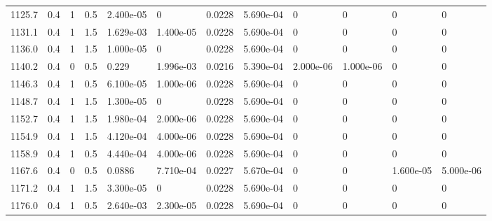 \documentclass[preview]{standalone}
\begin{document}
{{{{{{\begin{tabular}{L{1.2cm}C{1.2cm} C{0.3cm}C{0.5cm} C{1.4cm}C{1.4cm} C{1.4cm}C{1.4cm} C{1.6cm}C{1.6cm} C{1.6cm}C{1.6cm}}
  1125.7  &   0.4  & 1     & 0.5 &  2.400e-05  & 0  &  0.0228&   5.690e-04& 0 & 0   &  0 & 0  \\ 
  1131.1  &   0.4  & 1     & 1.5 &  1.629e-03  & 1.400e-05  &  0.0228&   5.690e-04& 0 & 0   &  0 & 0  \\ 
  1136.0  &   0.4  & 1     & 1.5 &  1.000e-05  & 0  &  0.0228&   5.690e-04& 0 & 0   &  0 & 0  \\ 
  1140.2  &   0.4  & 0     & 0.5 &  0.229  & 1.996e-03  &  0.0216&   5.390e-04& 2.000e-06 & 1.000e-06   &  0 & 0  \\ 
  1146.3  &   0.4  & 1     & 0.5 &  6.100e-05  & 1.000e-06  &  0.0228&   5.690e-04& 0 & 0   &  0 & 0  \\ 
  1148.7  &   0.4  & 1     & 1.5 &  1.300e-05  & 0  &  0.0228&   5.690e-04& 0 & 0   &  0 & 0  \\ 
  1152.7  &   0.4  & 1     & 1.5 &  1.980e-04  & 2.000e-06  &  0.0228&   5.690e-04& 0 & 0   &  0 & 0  \\ 
  1154.9  &   0.4  & 1     & 1.5 &  4.120e-04  & 4.000e-06  &  0.0228&   5.690e-04& 0 & 0   &  0 & 0  \\ 
  1158.9  &   0.4  & 1     & 0.5 &  4.440e-04  & 4.000e-06  &  0.0228&   5.690e-04& 0 & 0   &  0 & 0  \\ 
  1167.6  &   0.4  & 0     & 0.5 &  0.0886  & 7.710e-04  &  0.0227&   5.670e-04& 0 & 0   &  1.600e-05 & 5.000e-06  \\ 
  1171.2  &   0.4  & 1     & 1.5 &  3.300e-05  & 0  &  0.0228&   5.690e-04& 0 & 0   &  0 & 0  \\ 
  1176.0  &   0.4  & 1     & 0.5 &  2.640e-03  & 2.300e-05  &  0.0228&   5.690e-04& 0 & 0   &  0 & 0  \\ 
\hline 
\end{tabular} 

}}}}}}
\end{document}
